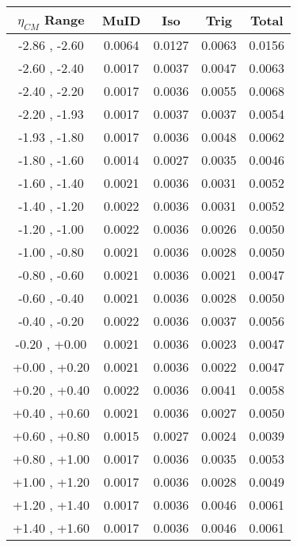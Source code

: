 \begin{table}[h!]
  \centering
  \renewcommand{\arraystretch}{1.5}
  \begin{tabular}{|c|*4c|}
    \hline
    $\eta_{CM}$ Range & MuID & Iso & Trig & Total\\
    \hline\hline
    -2.86 , -2.60 & 0.0064 & 0.0127 & 0.0063 & 0.0156\\
    \hline
    -2.60 , -2.40 & 0.0017 & 0.0037 & 0.0047 & 0.0063\\
    \hline
    -2.40 , -2.20 & 0.0017 & 0.0036 & 0.0055 & 0.0068\\
    \hline
    -2.20 , -1.93 & 0.0017 & 0.0037 & 0.0037 & 0.0054\\
    \hline
    -1.93 , -1.80 & 0.0017 & 0.0036 & 0.0048 & 0.0062\\
    \hline
    -1.80 , -1.60 & 0.0014 & 0.0027 & 0.0035 & 0.0046\\
    \hline
    -1.60 , -1.40 & 0.0021 & 0.0036 & 0.0031 & 0.0052\\
    \hline
    -1.40 , -1.20 & 0.0022 & 0.0036 & 0.0031 & 0.0052\\
    \hline
    -1.20 , -1.00 & 0.0022 & 0.0036 & 0.0026 & 0.0050\\
    \hline
    -1.00 , -0.80 & 0.0021 & 0.0036 & 0.0028 & 0.0050\\
    \hline
    -0.80 , -0.60 & 0.0021 & 0.0036 & 0.0021 & 0.0047\\
    \hline
    -0.60 , -0.40 & 0.0021 & 0.0036 & 0.0028 & 0.0050\\
    \hline
    -0.40 , -0.20 & 0.0022 & 0.0036 & 0.0037 & 0.0056\\
    \hline
    -0.20 , +0.00 & 0.0021 & 0.0036 & 0.0023 & 0.0047\\
    \hline
    +0.00 , +0.20 & 0.0021 & 0.0036 & 0.0022 & 0.0047\\
    \hline
    +0.20 , +0.40 & 0.0022 & 0.0036 & 0.0041 & 0.0058\\
    \hline
    +0.40 , +0.60 & 0.0021 & 0.0036 & 0.0027 & 0.0050\\
    \hline
    +0.60 , +0.80 & 0.0015 & 0.0027 & 0.0024 & 0.0039\\
    \hline
    +0.80 , +1.00 & 0.0017 & 0.0036 & 0.0035 & 0.0053\\
    \hline
    +1.00 , +1.20 & 0.0017 & 0.0036 & 0.0028 & 0.0049\\
    \hline
    +1.20 , +1.40 & 0.0017 & 0.0036 & 0.0046 & 0.0061\\
    \hline
    +1.40 , +1.60 & 0.0017 & 0.0036 & 0.0046 & 0.0061\\

\end{tabular}
\end{table}
